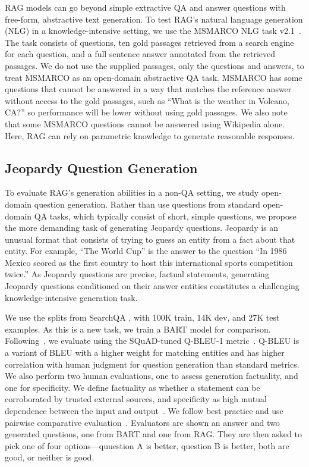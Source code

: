 RAG models 
can go beyond simple extractive QA 
and answer questions with free-form, abstractive text generation. To test RAG's natural language generation (NLG) in a knowledge-intensive setting, we use the MSMARCO NLG task v2.1~\cite{DBLP:conf/nips/NguyenRSGTMD16}. The task consists of questions, ten gold passages retrieved from a search engine for each question, and a full sentence answer annotated from the retrieved passages.
We do not use the supplied passages, only the questions and answers, to treat MSMARCO as an open-domain abstractive QA task. MSMARCO has some questions that cannot be answered in a way that matches the reference answer without access to the gold passages, such as ``What is the weather in Volcano, CA?'' so performance will be lower without using gold passages. 
We also note that some MSMARCO questions cannot be answered using Wikipedia alone. Here, RAG can rely on parametric knowledge to generate reasonable responses.

\subsection{Jeopardy Question Generation}

To evaluate RAG's generation abilities in a non-QA setting, we study open-domain question generation.
Rather than use questions from standard open-domain QA tasks, which typically consist of short, simple questions, we propose the more demanding task of generating Jeopardy questions. Jeopardy is an unusual format that consists of trying to guess an entity from a fact about that entity. For example, ``The World Cup'' is the answer to the question ``In 1986 Mexico scored as the first country to host this international sports competition twice.'' As Jeopardy questions are precise, factual statements, generating Jeopardy questions conditioned on their answer entities constitutes a challenging knowledge-intensive generation task. 

We use the splits from SearchQA
\cite{dunn_searchqa:_2017}, with 100K train, 14K dev, and 27K test examples. 
As this is a new task, we train a BART model for comparison.
Following~\cite{zhang-bansal-2019-addressing}, we evaluate using the SQuAD-tuned Q-BLEU-1 metric~\cite{nema-khapra-2018-towards}. Q-BLEU is a variant of BLEU with a higher weight for matching entities and has higher correlation with human judgment for question generation than standard metrics. 
We also perform two human evaluations, one to assess generation factuality, and one for specificity. We define factuality as whether a statement can be corroborated by trusted external sources, and specificity as high mutual dependence between the input and output~\cite{li-etal-2016-diversity}. 
We follow best practice and use pairwise comparative evaluation~\cite{Li2019ACUTEEVALID}. Evaluators are shown an answer and two generated questions, one from BART and one from RAG. They are then asked to pick one of four options---quuestion A is better, question B is better, both are good, or neither is good.

